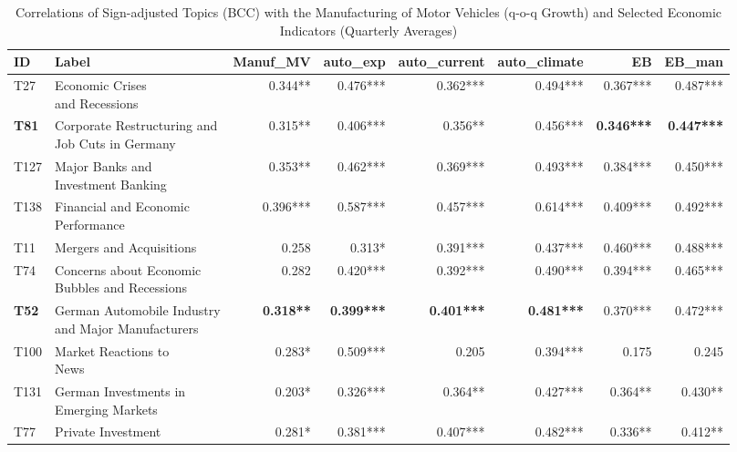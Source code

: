 \begin{table}[h!]
  \centering
  \begin{threeparttable}
    \scriptsize
    \renewcommand{\arraystretch}{1.3}
  \caption{Correlations of Sign-adjusted Topics (BCC) with the Manufacturing of Motor Vehicles (q-o-q Growth) and Selected Economic Indicators (Quarterly Averages)}
  \label{tab:cor_gdp_topics_bcc_2009_200_all_economic_indicators_quarterly}


\begin{tabular}{llrrrrrr}
\hline
ID & Label & Manuf\_MV & auto\_exp & auto\_current & auto\_climate & EB & EB\_man\\
\hline
T27 & \makecell[tl]{ Economic Crises \\ and Recessions} & 0.344** & 0.476*** & 0.362*** & 0.494*** & 0.367*** & 0.487***\\
\textbf{T81} & \makecell[tl]{ Corporate Restructuring and \\ Job Cuts in Germany} & 0.315** & 0.406*** & 0.356** & 0.456*** & \textbf{0.346***} & \textbf{0.447***}\\
T127 & \makecell[tl]{ Major Banks and \\ Investment Banking} & 0.353** & 0.462*** & 0.369*** & 0.493*** & 0.384*** & 0.450***\\
T138 & \makecell[tl]{ Financial and Economic \\ Performance} & 0.396*** & 0.587*** & 0.457*** & 0.614*** & 0.409*** & 0.492***\\
T11 & Mergers and Acquisitions & 0.258 & 0.313* & 0.391*** & 0.437*** & 0.460*** & 0.488***\\
\addlinespace
T74 & \makecell[tl]{ Concerns about Economic\\ Bubbles and Recessions} & 0.282 & 0.420*** & 0.392*** & 0.490*** & 0.394*** & 0.465***\\
\textbf{T52} & \makecell[tl]{ German Automobile Industry \\ and Major Manufacturers} & \textbf{0.318**} & \textbf{0.399***} & \textbf{0.401***} & \textbf{0.481***} & 0.370*** & 0.472***\\
T100 & \makecell[tl]{ Market Reactions to \\News} & 0.283* & 0.509*** & 0.205 & 0.394*** & 0.175 & 0.245\\
T131 & \makecell[tl]{German Investments in \\ Emerging Markets} & 0.203* & 0.326*** & 0.364** & 0.427*** & 0.364** & 0.430**\\
T77 & Private Investment & 0.281* & 0.381*** & 0.407*** & 0.482*** & 0.336** & 0.412**\\
\hline
\end{tabular}


\end{threeparttable}
\end{table}
